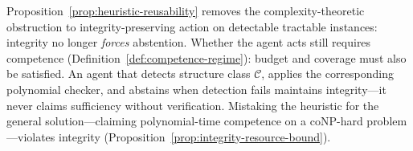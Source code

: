 \begin{remark}
Proposition~\ref{prop:heuristic-reusability} removes the complexity-theoretic obstruction to integrity-preserving action on detectable tractable instances: integrity no longer \emph{forces} abstention. Whether the agent acts still requires competence (Definition~\ref{def:competence-regime}): budget and coverage must also be satisfied. An agent that detects structure class $\mathcal{C}$, applies the corresponding polynomial checker, and abstains when detection fails maintains integrity---it never claims sufficiency without verification. Mistaking the heuristic for the general solution---claiming polynomial-time competence on a coNP-hard problem---violates integrity (Proposition~\ref{prop:integrity-resource-bound}).
\end{remark}
